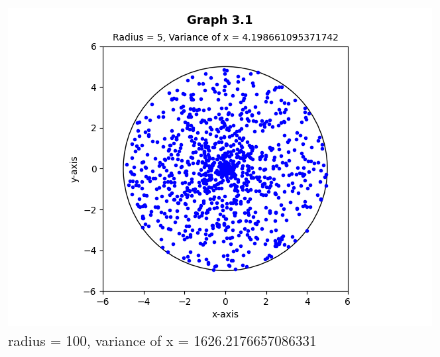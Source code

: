 \documentclass[answers]{exam}
\begin{document}
\begin{figure}[h]
  \caption{radius = 100, variance of x = 1626.2176657086331}
  \centering
  \includegraphics[scale=0.7]{Q3/Q3(1).png}
\end{figure}

\end{document}
